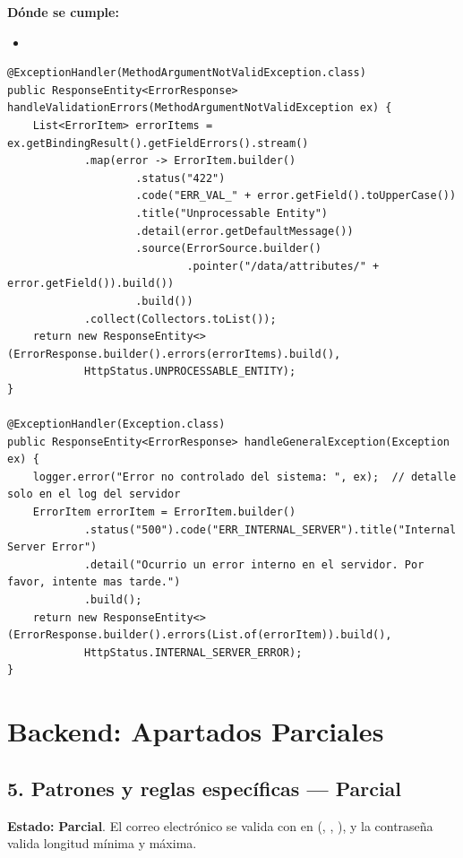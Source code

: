\documentclass[11pt,a4paper]{article}
\newcommand{\Parcial}{\textcolor{parcialColor}{\textbf{Parcial}}}
\begin{document}
\textbf{Dónde se cumple:}
\begin{itemize}[leftmargin=1.2cm,nosep]
\item \texttt{}
\end{itemize}

\begin{lstlisting}[style=javastyle,caption={Traducción de errores de validación a HTTP 422, uno por campo (GlobalExceptionHandler.java)}]
@ExceptionHandler(MethodArgumentNotValidException.class)
public ResponseEntity<ErrorResponse> handleValidationErrors(MethodArgumentNotValidException ex) {
    List<ErrorItem> errorItems = ex.getBindingResult().getFieldErrors().stream()
            .map(error -> ErrorItem.builder()
                    .status("422")
                    .code("ERR_VAL_" + error.getField().toUpperCase())
                    .title("Unprocessable Entity")
                    .detail(error.getDefaultMessage())
                    .source(ErrorSource.builder()
                            .pointer("/data/attributes/" + error.getField()).build())
                    .build())
            .collect(Collectors.toList());
    return new ResponseEntity<>(ErrorResponse.builder().errors(errorItems).build(),
            HttpStatus.UNPROCESSABLE_ENTITY);
}

@ExceptionHandler(Exception.class)
public ResponseEntity<ErrorResponse> handleGeneralException(Exception ex) {
    logger.error("Error no controlado del sistema: ", ex);  // detalle solo en el log del servidor
    ErrorItem errorItem = ErrorItem.builder()
            .status("500").code("ERR_INTERNAL_SERVER").title("Internal Server Error")
            .detail("Ocurrio un error interno en el servidor. Por favor, intente mas tarde.")
            .build();
    return new ResponseEntity<>(ErrorResponse.builder().errors(List.of(errorItem)).build(),
            HttpStatus.INTERNAL_SERVER_ERROR);
}
\end{lstlisting}

\section{Backend: Apartados Parciales}
\label{sec:backend-parcial}

\subsection{5. Patrones y reglas específicas --- \Parcial}

\textbf{Estado:} \Parcial. El correo electrónico se valida con \texttt{} en \texttt{} (\texttt{}, \texttt{}, \texttt{}), y la contraseña valida longitud mínima y máxima.
\end{document}
